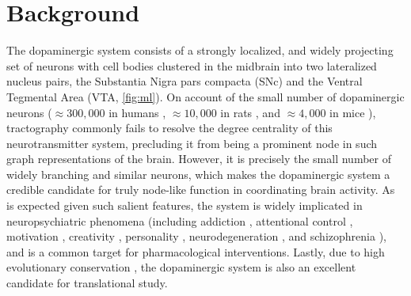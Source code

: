 \section{Background}


The dopaminergic system consists of a strongly localized, and widely projecting set of neurons with cell bodies clustered in the midbrain into two lateralized nucleus pairs, the Substantia Nigra pars compacta (SNc) and the Ventral Tegmental Area (VTA, \cref{fig:ml}).
On account of the small number of dopaminergic neurons ($\approx300,000$ in humans \cite{rice2016}, $\approx10,000$ in rats \cite{german1993}, and $\approx4,000$ in mice \cite{triarhou1988}), tractography commonly fails to resolve the degree centrality of this neurotransmitter system, precluding it from being a prominent node in such graph representations of the brain.
However, it is precisely the small number of widely branching and similar neurons, which makes the dopaminergic system a credible candidate for truly node-like function in coordinating brain activity.
As is expected given such salient features, the system is widely implicated in neuropsychiatric phenomena (including
addiction \cite{DiChiara1988,DiChiara1999},
attentional control \cite{Nieoullon2002},
motivation \cite{Salamone1994},
creativity \cite{Chermahini2010},
personality \cite{Depue1999},
neurodegeneration \cite{Masliah2000},
and schizophrenia \cite{Howes2009}),
and is a common target for pharmacological interventions.
Lastly, due to high evolutionary conservation \cite{Yamamoto2011}, the dopaminergic system is also an excellent candidate for translational study.


